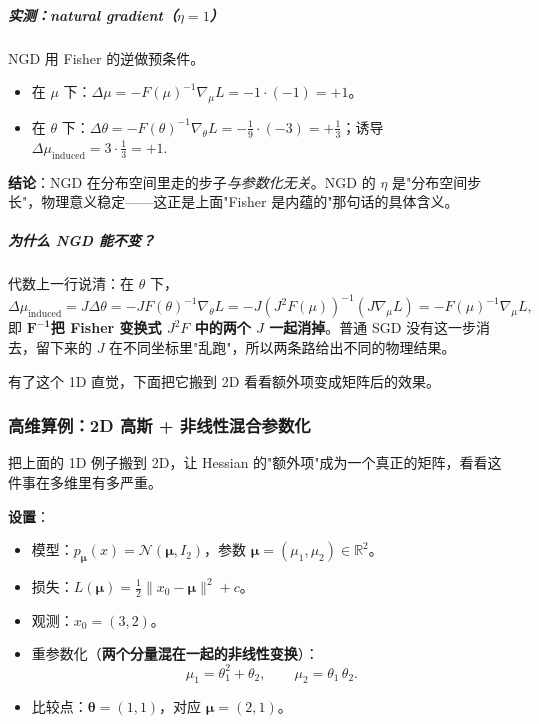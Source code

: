 \documentclass[11pt,a4paper]{article}
\theoremstyle{mythm}
\theoremstyle{mydef}
\newcommand{\R}{\mathbb{R}}
\begin{document}
\subparagraph{实测：natural gradient（$\eta=1$）}
NGD 用 Fisher 的逆做预条件。
\begin{itemize}[leftmargin=2em]
\item 在 $\mu$ 下：$\Delta\mu = -F(\mu)^{-1}\nabla_\mu L = -1\cdot(-1) = +1$。
\item 在 $\theta$ 下：$\Delta\theta = -F(\theta)^{-1}\nabla_\theta L = -\tfrac{1}{9}\cdot(-3) = +\tfrac{1}{3}$；诱导
$\Delta\mu_{\text{induced}} = 3\cdot\tfrac{1}{3} = +1$.
\end{itemize}
\begin{center}
\end{center}
\textbf{结论}：NGD 在分布空间里走的步子\emph{与参数化无关}。NGD 的 $\eta$ 是"分布空间步长"，物理意义稳定——这正是上面"Fisher 是内蕴的"那句话的具体含义。

\subparagraph{为什么 NGD 能不变？}
代数上一行说清：在 $\theta$ 下，
$$\Delta\mu_{\text{induced}} = J\Delta\theta = -J F(\theta)^{-1}\nabla_\theta L = -J(J^2 F(\mu))^{-1}(J\nabla_\mu L) = -F(\mu)^{-1}\nabla_\mu L,$$
即 $\boldsymbol{F^{-1}}$\textbf{把 Fisher 变换式 $J^2 F$ 中的两个 $J$ 一起消掉}。普通 SGD 没有这一步消去，留下来的 $J$ 在不同坐标里"乱跑"，所以两条路给出不同的物理结果。

\medskip
有了这个 1D 直觉，下面把它搬到 2D 看看额外项变成矩阵后的效果。

\subsubsection*{高维算例：2D 高斯 + 非线性混合参数化}

把上面的 1D 例子搬到 2D，让 Hessian 的"额外项"成为一个真正的矩阵，看看这件事在多维里有多严重。

\textbf{设置}：
\begin{itemize}[leftmargin=2em]
\item 模型：$p_{\boldsymbol\mu}(x) = \mathcal{N}(\boldsymbol\mu, I_2)$，参数 $\boldsymbol\mu = (\mu_1, \mu_2)\in\R^2$。
\item 损失：$L(\boldsymbol\mu) = \tfrac{1}{2}\|x_0 - \boldsymbol\mu\|^2 + c$。
\item 观测：$x_0 = (3, 2)$。
\item 重参数化（\textbf{两个分量混在一起的非线性变换}）：
$$\mu_1 = \theta_1^2 + \theta_2,\qquad \mu_2 = \theta_1\,\theta_2.$$
\item 比较点：$\boldsymbol\theta = (1, 1)$，对应 $\boldsymbol\mu = (2, 1)$。
\end{itemize}
\end{document}
